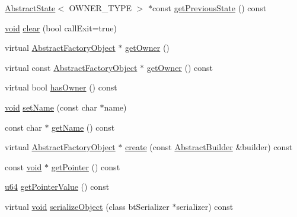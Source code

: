 \begin{DoxyCompactItemize}
\mbox{\hyperlink{classnjli_1_1_abstract_state}{Abstract\+State}}$<$ O\+W\+N\+E\+R\+\_\+\+T\+Y\+PE $>$ $\ast$const \mbox{\hyperlink{classnjli_1_1_abstract_state_machine_a8e946baa055b5dcde6a9916ef10e5c37}{get\+Previous\+State}} () const
\item 
\mbox{\hyperlink{_thread_8h_af1e856da2e658414cb2456cb6f7ebc66}{void}} \mbox{\hyperlink{classnjli_1_1_abstract_state_machine_a9b0f3cb1aed0c33381d85f204cde6f88}{clear}} (bool call\+Exit=true)
\item 
virtual \mbox{\hyperlink{classnjli_1_1_abstract_factory_object}{Abstract\+Factory\+Object}} $\ast$ \mbox{\hyperlink{classnjli_1_1_abstract_state_machine_aabf808253d72265695e03c299a434798}{get\+Owner}} ()
\item 
virtual const \mbox{\hyperlink{classnjli_1_1_abstract_factory_object}{Abstract\+Factory\+Object}} $\ast$ \mbox{\hyperlink{classnjli_1_1_abstract_state_machine_ade6a658a2ad9ef8c83b900e8b866ae7c}{get\+Owner}} () const
\item 
virtual bool \mbox{\hyperlink{classnjli_1_1_abstract_state_machine_a5e4cb433301c576d640fff966b2c87eb}{has\+Owner}} () const
\item 
\mbox{\hyperlink{_thread_8h_af1e856da2e658414cb2456cb6f7ebc66}{void}} \mbox{\hyperlink{classnjli_1_1_abstract_state_machine_a087eb5f8d9f51cc476f12f1d10a3cb95}{set\+Name}} (const char $\ast$name)
\item 
const char $\ast$ \mbox{\hyperlink{classnjli_1_1_abstract_state_machine_ad41266885be835f3ee602311e20877a4}{get\+Name}} () const
\item 
virtual \mbox{\hyperlink{classnjli_1_1_abstract_factory_object}{Abstract\+Factory\+Object}} $\ast$ \mbox{\hyperlink{classnjli_1_1_abstract_state_machine_a83a8876ae63b92804004cf3febe76573}{create}} (const \mbox{\hyperlink{classnjli_1_1_abstract_builder}{Abstract\+Builder}} \&builder) const
\item 
const \mbox{\hyperlink{_thread_8h_af1e856da2e658414cb2456cb6f7ebc66}{void}} $\ast$ \mbox{\hyperlink{classnjli_1_1_abstract_state_machine_ac4ca71716ed832be357f15f8262c8448}{get\+Pointer}} () const
\item 
\mbox{\hyperlink{_util_8h_ad758b7a5c3f18ed79d2fcd23d9f16357}{u64}} \mbox{\hyperlink{classnjli_1_1_abstract_state_machine_a4ffddf141a426a5a07d0ac19f1913811}{get\+Pointer\+Value}} () const
\item 
virtual \mbox{\hyperlink{_thread_8h_af1e856da2e658414cb2456cb6f7ebc66}{void}} \mbox{\hyperlink{classnjli_1_1_abstract_state_machine_a4fc4bcd9d1930911474210c047372fc0}{serialize\+Object}} (class bt\+Serializer $\ast$serializer) const
\end{DoxyCompactItemize}
